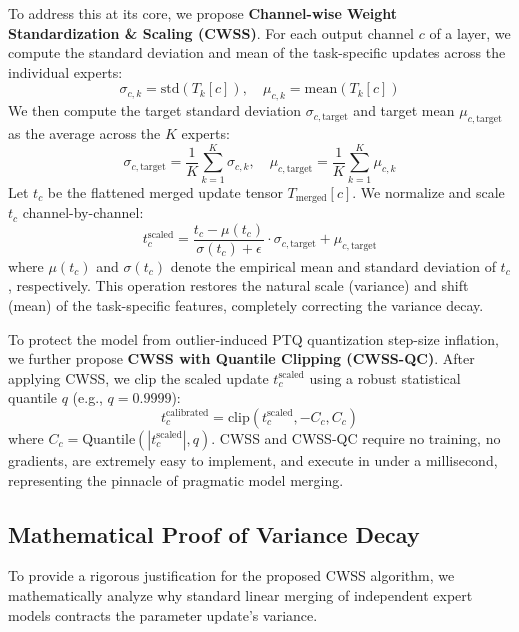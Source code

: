 \documentclass{article}
\theoremstyle{plain}
\theoremstyle{definition}
\theoremstyle{remark}
\begin{document}
To address this at its core, we propose \textbf{Channel-wise Weight Standardization \& Scaling (CWSS)}. For each output channel $c$ of a layer, we compute the standard deviation and mean of the task-specific updates across the individual experts:
\begin{equation}
\sigma_{c, k} = \text{std}(T_k[c]), \quad \mu_{c, k} = \text{mean}(T_k[c])
\end{equation}
We then compute the target standard deviation $\sigma_{c, \text{target}}$ and target mean $\mu_{c, \text{target}}$ as the average across the $K$ experts:
\begin{equation}
\sigma_{c, \text{target}} = \frac{1}{K}\sum_{k=1}^K \sigma_{c, k}, \quad \mu_{c, \text{target}} = \frac{1}{K}\sum_{k=1}^K \mu_{c, k}
\end{equation}
Let $t_c$ be the flattened merged update tensor $T_{\text{merged}}[c]$. We normalize and scale $t_c$ channel-by-channel:
\begin{equation}
t_c^{\text{scaled}} = \frac{t_c - \mu(t_c)}{\sigma(t_c) + \epsilon} \cdot \sigma_{c, \text{target}} + \mu_{c, \text{target}}
\end{equation}
where $\mu(t_c)$ and $\sigma(t_c)$ denote the empirical mean and standard deviation of $t_c$, respectively. This operation restores the natural scale (variance) and shift (mean) of the task-specific features, completely correcting the variance decay.

To protect the model from outlier-induced PTQ quantization step-size inflation, we further propose \textbf{CWSS with Quantile Clipping (CWSS-QC)}. After applying CWSS, we clip the scaled update $t_c^{\text{scaled}}$ using a robust statistical quantile $q$ (e.g., $q = 0.9999$):
\begin{equation}
t_c^{\text{calibrated}} = \text{clip}(t_c^{\text{scaled}}, -C_c, C_c)
\end{equation}
where $C_c = \text{Quantile}(|t_c^{\text{scaled}}|, q)$.
CWSS and CWSS-QC require no training, no gradients, are extremely easy to implement, and execute in under a millisecond, representing the pinnacle of pragmatic model merging.

\subsection{Mathematical Proof of Variance Decay}
To provide a rigorous justification for the proposed CWSS algorithm, we mathematically analyze why standard linear merging of independent expert models contracts the parameter update's variance. 
\end{document}
